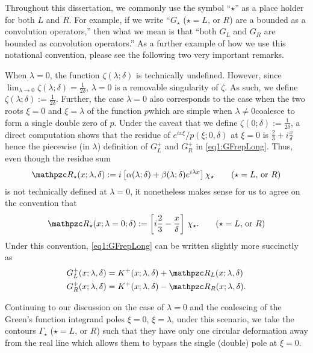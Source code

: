 \documentclass[../dissertation.tex]{subfiles}
\begin{document}
\begin{rmk}\label{rmk1:StarNotation}
	Throughout this dissertation, we commonly use the symbol ``$\star$''
	as a place holder for both $L$ and $R$. For example, if we write ``$G_\star$ 
	($\star = L \text{, or } R$) are a bounded as a convolution operators,'' then 
	what we mean is that ``both $G_L$ and $G_R$ are bounded as convolution 
	operators.'' As a further example of how we use this notational convention, 
	please see the following two very important remarks.
\end{rmk}




\begin{rmk}\label{rmk1:ResidueLimits}
	When $\lambda = 0$, the function $\zeta(\lambda; \delta)$ is technically 
	undefined. However, since 
	$\lim_{\lambda\to0}\zeta(\lambda; \delta) = \frac{1}{2\delta}$, $\lambda = 0$
	is a removable singularity of $\zeta$. As such, we define 
	$\zeta(\lambda; \delta) := \frac{1}{2\delta}$. Further, the case $\lambda=0$ 
	also corresponds to the case when the two roots $\xi = 0$ and $\xi = \lambda$ 
	of the function $p$\textemdash{}which are simple when 
	$\lambda \ne 0$\textemdash{}coalesce to form a single double zero of $p$. Under 
	the caveat that we define $\zeta(0; \delta):= \frac{1}{2\delta}$, a direct computation 
	shows that the residue of $e^{ix\xi} / p(\xi; 0, \delta)$ at $\xi = 0$ is 
	$\frac{2}{3} + i \frac{x}{\delta}$\textemdash{}hence the piecewise (in $\lambda$)
	definition of $G_L^+$ and $G_R^+$ in \eqref{eq1:GFrepLong}.
	Thus, even though the residue sum 
	\[
		\mathpzc R_\star (x; \lambda, \delta) 
			:= i 
				\left[
					\alpha(\lambda; \delta) + \beta(\lambda; \delta) e^{i\lambda x}
				\right] \chi_\star
			\qquad (\star = L \text{, or } R)
	\]
	\label{sym1:ressum}is not technically defined at 
	$\lambda = 0$, it nonetheless makes sense for us to agree on the convention 
	that
	\[
		\mathpzc R_\star(x; \lambda = 0; \delta)
			:= \left[ i \frac{2}{3} - \frac{x}{\delta} \right] \, \chi_\star.
		\qquad (\star = L \text{, or } R)
	\]
	Under this convention, \eqref{eq1:GFrepLong} can be written slightly more succinctly as
	\begin{subequations}
		\label{eq1:GFrep}
		\begin{align}
			\label{eq1:GLrep}
			G_L^+(x; \lambda, \delta)
				&=
					K^+(x; \lambda, \delta) 
					+ \mathpzc R_L(x; \lambda, \delta)\\
			\label{eq1:GRrep}
			G_R^+(x; \lambda, \delta) &= 
				K^+(x; \lambda, \delta) 
					- \mathpzc R_R(x; \lambda, \delta).
		\end{align}
	\end{subequations}
\end{rmk}




\begin{rmk}\label{rmk1:ContourAdjustment}
	Continuing to our discussion on the case of $\lambda = 0$ and the 
	coalescing of the Green's function integrand poles $\xi = 0$, $\xi = \lambda$,
	under this scenario, we take the contours $\Gamma_\star$ 
	($\star = L \text{, or } R$) such that they have only one circular deformation
	away from the real line which allows them to bypass the single (double) pole
	at $\xi = 0$. 
\end{rmk}
\end{document}
